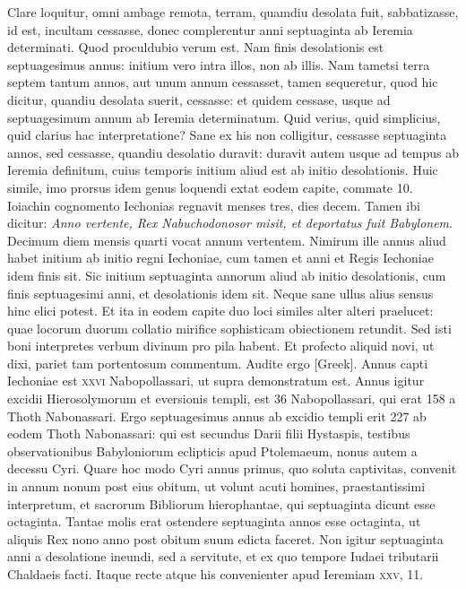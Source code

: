 \begin{parnumbers}
{}
\lnr{}Clare loquitur, omni ambage remota, terram,
quamdiu desolata fuit, sabbatizasse, id est, incultam cessasse, donec
complerentur anni septuaginta ab Ieremia determinati.
\lnr{}Quod
proculdubio verum est.
\lnr{}Nam finis desolationis est septuagesimus
annus: initium vero intra illos, non ab illis.
\lnr{}Nam tametsi terra septem
tantum annos, aut unum annum cessasset, tamen sequeretur,
quod hic dicitur, quandiu desolata suerit, cessasse: et quidem cessase,
usque ad septuagesimum annum ab Ieremia determinatum.
\lnr{}Quid verius, quid simplicius, quid clarius hac interpretatione?
\lnr{}Sane
ex his non colligitur, cessasse septuaginta annos, sed cessasse,
quandiu desolatio duravit: duravit autem usque ad tempus ab Ieremia
definitum, cuius temporis initium aliud est ab initio desolationis.
\lnr{}Huic simile, imo prorsus idem genus loquendi extat eodem capite,
commate 10.
\lnr{}Ioiachin cognomento Iechonias regnavit menses tres,
dies decem.
\lnr{}Tamen ibi dicitur: \textit{Anno vertente, Rex Nabuchodonosor
misit, et deportatus fuit Babylonem}.
\lnr{}Decimum diem mensis quarti
vocat annum vertentem.
\lnr{}Nimirum ille annus aliud habet initium
ab initio regni Iechoniae, cum tamen et anni et Regis Iechoniae
idem finis sit.
\lnr{}Sic initium septuaginta annorum aliud ab initio desolationis,
cum finis septuagesimi anni, et desolationis idem sit.
\lnr{}Neque sane ullus alius sensus hinc elici potest.
\lnr{}Et ita in eodem capite
duo loci similes alter alteri praelucet: quae locorum duorum
collatio mirifice sophisticam obiectionem retundit.
\lnr{}Sed isti boni
interpretes verbum divinum pro pila habent.
\lnr{}Et profecto aliquid
novi, ut dixi, pariet tam portentosum commentum.
\lnr{}Audite
ergo \textgreek{[Greek]}.
\lnr{}Annus capti Iechoniae est \textsc{xxvi} Nabopollassari,
ut supra demonstratum est.
\lnr{}Annus igitur excidii Hierosolymorum
et eversionis templi, est 36 Nabopollassari, qui erat 158 a
Thoth Nabonassari.
\lnr{}Ergo septuagesimus annus ab excidio templi
erit 227 ab eodem Thoth Nabonassari: qui est secundus Darii filii
Hystaspis, testibus observationibus Babyloniorum eclipticis apud
Ptolemaeum, nonus autem a decessu Cyri.
\lnr{}Quare hoc modo
Cyri annus primus, quo soluta captivitas, convenit in annum
nonum post eius obitum, ut volunt acuti homines, praestantissimi
interpretum, et sacrorum Bibliorum hierophantae, qui septuaginta
dicunt esse octaginta.
\lnr{}Tantae molis erat ostendere septuaginta
annos esse octaginta, ut aliquis Rex nono anno post obitum
suum edicta faceret.
\lnr{}Non igitur septuaginta anni a desolatione
ineundi, sed a servitute, et ex quo tempore Iudaei tributarii
Chaldaeis facti.
\lnr{}Itaque recte atque his convenienter apud Ieremiam
\textsc{xxv}, 11.


\end{parnumbers}
